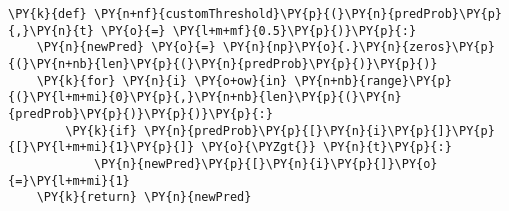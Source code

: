 {\par%
\vspace{-1\baselineskip}%
}%
\begin{notebookcell}[]%
\begin{addmargin}[\cellleftmargin]{0em}%
{\smaller%
\par%
%
\vspace{-1\smallerfontscale}%
\begin{Verbatim}[commandchars=\\\{\}]
\PY{k}{def} \PY{n+nf}{customThreshold}\PY{p}{(}\PY{n}{predProb}\PY{p}{,}\PY{n}{t} \PY{o}{=} \PY{l+m+mf}{0.5}\PY{p}{)}\PY{p}{:}
    \PY{n}{newPred} \PY{o}{=} \PY{n}{np}\PY{o}{.}\PY{n}{zeros}\PY{p}{(}\PY{n+nb}{len}\PY{p}{(}\PY{n}{predProb}\PY{p}{)}\PY{p}{)}
    \PY{k}{for} \PY{n}{i} \PY{o+ow}{in} \PY{n+nb}{range}\PY{p}{(}\PY{l+m+mi}{0}\PY{p}{,}\PY{n+nb}{len}\PY{p}{(}\PY{n}{predProb}\PY{p}{)}\PY{p}{)}\PY{p}{:}
        \PY{k}{if} \PY{n}{predProb}\PY{p}{[}\PY{n}{i}\PY{p}{]}\PY{p}{[}\PY{l+m+mi}{1}\PY{p}{]} \PY{o}{\PYZgt{}} \PY{n}{t}\PY{p}{:}
            \PY{n}{newPred}\PY{p}{[}\PY{n}{i}\PY{p}{]}\PY{o}{=}\PY{l+m+mi}{1}
    \PY{k}{return} \PY{n}{newPred}   
\end{Verbatim}
%
\par%
\vspace{-1\smallerfontscale}}%
\end{addmargin}
\end{notebookcell}



